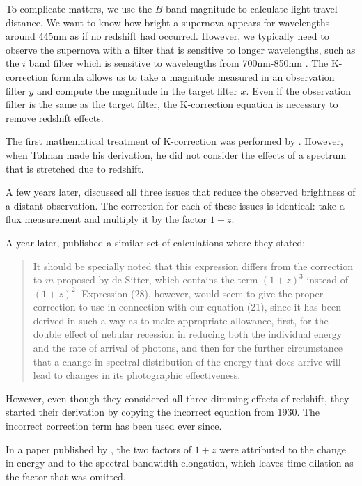 \documentclass[aps,prl,reprint,amsmath,floatfix]{revtex4-2}
\begin{document}
To complicate matters, we use the $B$ band magnitude to calculate light travel
distance. We want to know how bright a supernova appears for wavelengths around
445nm as if no redshift had occurred. However, we typically need to observe the
supernova with a filter that is sensitive to longer wavelengths, such as the
$i$ band filter which is sensitive to wavelengths from 700nm-850nm
\citep{flaugher2015}. The K-correction formula allows us to take a magnitude
measured in an observation filter $y$ and compute the magnitude in the target
filter $x$. Even if the observation filter is the same as the target filter,
the K-correction equation is necessary to remove redshift effects.

The first mathematical treatment of K-correction was performed by
\citet{tolman1930}. However, when Tolman made his derivation, he did not
consider the effects of a spectrum that is stretched due to redshift.

A few years later, \citet{desitter1934} discussed all three issues that reduce
the observed brightness of a distant observation. The correction for each of
these issues is identical: take a flux measurement and multiply it by the
factor $1 + z$.

A year later, \citet{hubble1935} published a similar set of calculations where
they stated:

\begin{quote}
It should be specially noted that this expression differs from the correction
to $m$ proposed by de Sitter, which contains the term $(1 + z)^3$ instead of
$(1 + z)^2$. Expression (28), however, would seem to give the proper correction
to use in connection with our equation (21), since it has been derived in such
a way as to make appropriate allowance, first, for the double effect of nebular
recession in reducing both the individual energy and the rate of arrival of
photons, and then for the further circumstance that a change in spectral
distribution of the energy that does arrive will lead to changes in its
photographic effectiveness.
\end{quote}

\noindent However, even though they considered all three dimming effects of
redshift, they started their derivation by copying the incorrect equation from
1930. The incorrect correction term has been used ever since.

In a paper published by \citet{oke1968}, the two factors of ${1 + z}$ were
attributed to the change in energy and to the spectral bandwidth elongation,
which leaves time dilation as the factor that was omitted.
\end{document}
